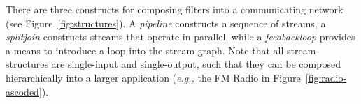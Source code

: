 There are three constructs for composing filters into a communicating
network (see Figure~\ref{fig:structures}).  A {\it pipeline}
constructs a sequence of streams, a {\it splitjoin} constructs streams
that operate in parallel, while a {\it feedbackloop} provides a means
to introduce a loop into the stream graph.  Note that all stream
structures are single-input and single-output, such that they can be
composed hierarchically into a larger application ({\it e.g.,} the FM
Radio in Figure~\ref{fig:radio-ascoded}).





